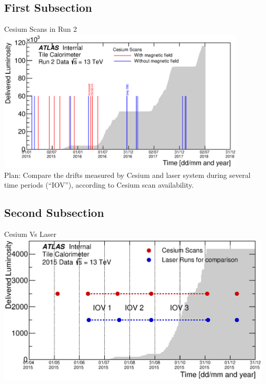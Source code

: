 \documentclass{beamer}
\begin{document}
\subsection{First Subsection}
\centering
\begin{frame}{Cesium Scans in Run 2}{}
\includegraphics[width=0.9\textwidth]{CesiumScans_run2.eps}\\
Plan: Compare the drifts measured by Cesium	and	laser system during	several time periods (“IOV”), according	to Cesium scan availability.
\end{frame}

\subsection{Second Subsection}

\begin{frame}{Cesium Vs Laser}
 \centering
 \includegraphics[width=\textwidth]{CsLas_IOVs_2015.eps}
 	\end{frame}
\end{document}
